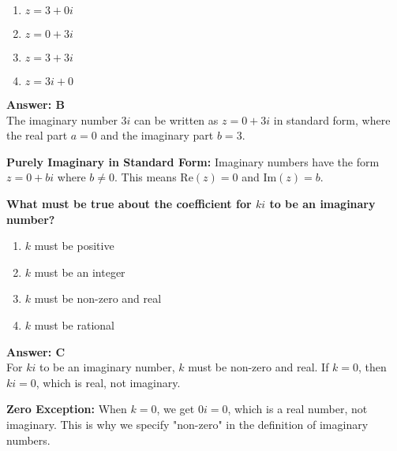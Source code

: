 \documentclass[12pt,a4paper]{article}
\begin{document}
\begin{partbox}[Options]
\begin{enumerate}[label=\Alph*.]
    \item \( z = 3 + 0i \)
    \item \( z = 0 + 3i \)
    \item \( z = 3 + 3i \)
    \item \( z = 3i + 0 \)
\end{enumerate}
\end{partbox}

\begin{answerstyle}
\textbf{Answer: B} \\
The imaginary number \( 3i \) can be written as \( z = 0 + 3i \) in standard form, where the real part \( a = 0 \) and the imaginary part \( b = 3 \).
\end{answerstyle}

\begin{conceptbox}
\textbf{Purely Imaginary in Standard Form:} Imaginary numbers have the form \( z = 0 + bi \) where \( b \neq 0 \). This means \( \text{Re}(z) = 0 \) and \( \text{Im}(z) = b \).
\end{conceptbox}

\newpage
\begin{questiontitle}[MCQ 29]
\textbf{What must be true about the coefficient for \( ki \) to be an imaginary number?}
\end{questiontitle}

\begin{partbox}[Options]
\begin{enumerate}[label=\Alph*.]
    \item \( k \) must be positive
    \item \( k \) must be an integer
    \item \( k \) must be non-zero and real
    \item \( k \) must be rational
\end{enumerate}
\end{partbox}

\begin{answerstyle}
\textbf{Answer: C} \\
For \( ki \) to be an imaginary number, \( k \) must be non-zero and real. If \( k = 0 \), then \( ki = 0 \), which is real, not imaginary.
\end{answerstyle}

\begin{conceptbox}
\textbf{Zero Exception:} When \( k = 0 \), we get \( 0i = 0 \), which is a real number, not imaginary. This is why we specify "non-zero" in the definition of imaginary numbers.
\end{conceptbox}
\end{document}
